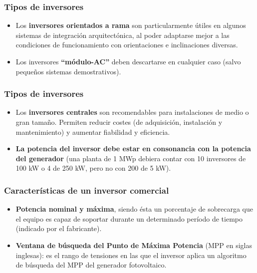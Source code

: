 \documentclass[serif, xcolor=dvipsnames]{beamer}
\begin{document}
\begin{frame}
  \frametitle{Tipos de inversores}
  \begin{itemize}
  \item Los \textbf{inversores orientados a rama} son particularmente
    útiles en algunos sistemas de integración arquitectónica, al poder
    adaptarse mejor a las condiciones de funcionamiento con
    orientaciones e inclinaciones diversas.
  \item Los inversores
    \textbf{\textquotedblleft{}módulo-AC\textquotedblright{}} deben
    descartarse en cualquier caso (salvo pequeños sistemas
    demostrativos).
  \end{itemize}

\end{frame}
\begin{frame}
  \frametitle{Tipos de inversores}
  \begin{itemize}
  \item Los \textbf{inversores centrales} son recomendables para
    instalaciones de medio o gran tamaño. Permiten reducir costes (de
    adquisición, instalación y mantenimiento) y aumentar fiabilidad y
    eficiencia.
  \item \textbf{La potencia del inversor debe estar en consonancia con
      la potencia del generador} (una planta de 1 MWp debiera contar
    con 10 inversores de 100 kW o 4 de 250 kW, pero no con 200 de 5
    kW).
  \end{itemize}

\end{frame}
\begin{frame}
  \frametitle{Características de un inversor comercial}
  \begin{itemize}
  \item \textbf{Potencia nominal y máxima}, siendo ésta un porcentaje
    de sobrecarga que el equipo es capaz de soportar durante un
    determinado período de tiempo (indicado por el fabricante).
  \item \textbf{Ventana de búsqueda del Punto de Máxima Potencia} (MPP
    en siglas inglesas): es el rango de tensiones en las que el
    inversor aplica un algoritmo de búsqueda del MPP del generador
    fotovoltaico.
  \end{itemize}

\end{frame}
\end{document}
